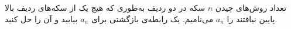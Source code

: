 \EXERCISE
تعداد روش‌های چیدن
$n$
سکه در دو ردیف به‌طوری که هیچ یک از سکه‌های ردیف بالا پایین نیافتند را
$a_n$
می‌نامیم. یک رابطه‌ی بازگشتی برای
$a_n$
بیابید و آن را حل کنید.